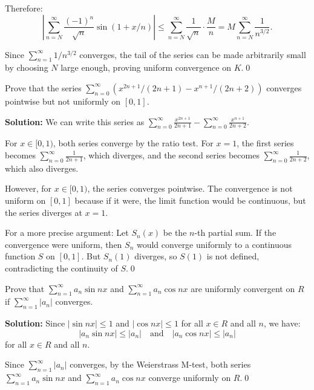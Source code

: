 Therefore:
\[\left|\sum_{n=N}^{\infty} \frac{(-1)^n}{\sqrt{n}} \sin(1 + x/n)\right| \leq \sum_{n=N}^{\infty} \frac{1}{\sqrt{n}} \cdot \frac{M}{n} = M \sum_{n=N}^{\infty} \frac{1}{n^{3/2}}.\]

Since \( \sum_{n=1}^{\infty} 1/n^{3/2} \) converges, the tail of the series can be made arbitrarily small by choosing \( N \) large enough, proving uniform convergence on \( K \).\qed


\begin{problembox}
Prove that the series \(\sum_{n=0}^{\infty} (x^{2n+1}/(2n + 1) - x^{n+1}/(2n + 2))\) converges pointwise but not uniformly on \([0, 1]\).
\end{problembox}

\noindent\textbf{Solution:} We can write this series as \( \sum_{n=0}^{\infty} \frac{x^{2n+1}}{2n + 1} - \sum_{n=0}^{\infty} \frac{x^{n+1}}{2n + 2} \).

For \( x \in [0, 1) \), both series converge by the ratio test. For \( x = 1 \), the first series becomes \( \sum_{n=0}^{\infty} \frac{1}{2n + 1} \), which diverges, and the second series becomes \( \sum_{n=0}^{\infty} \frac{1}{2n + 2} \), which also diverges.

However, for \( x \in [0, 1) \), the series converges pointwise. The convergence is not uniform on \([0, 1]\) because if it were, the limit function would be continuous, but the series diverges at \( x = 1 \).

For a more precise argument: Let \( S_n(x) \) be the \( n \)-th partial sum. If the convergence were uniform, then \( S_n \) would converge uniformly to a continuous function \( S \) on \([0, 1]\). But \( S_n(1) \) diverges, so \( S(1) \) is not defined, contradicting the continuity of \( S \).\qed


\begin{problembox}
Prove that \(\sum_{n=1}^{\infty} a_n \sin nx \) and \(\sum_{n=1}^{\infty} a_n \cos nx \) are uniformly convergent on \( R \) if \(\sum_{n=1}^{\infty} |a_n| \) converges.
\end{problembox}

\noindent\textbf{Solution:} Since \( |\sin nx| \leq 1 \) and \( |\cos nx| \leq 1 \) for all \( x \in R \) and all \( n \), we have:
\[|a_n \sin nx| \leq |a_n| \quad \text{and} \quad |a_n \cos nx| \leq |a_n|\]
for all \( x \in R \) and all \( n \).

Since \( \sum_{n=1}^{\infty} |a_n| \) converges, by the Weierstrass M-test, both series \( \sum_{n=1}^{\infty} a_n \sin nx \) and \( \sum_{n=1}^{\infty} a_n \cos nx \) converge uniformly on \( R \).\qed


